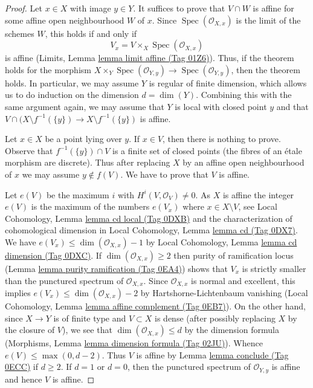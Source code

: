 \documentclass{amsart}
\theoremstyle{plain}
\theoremstyle{definition}
\theoremstyle{remark}
\numberwithin{equation}{subsection}
\def\Spec{\mathop{\mathrm{Spec}}}
\begin{document}
\begin{proof}
Let $x \in X$ with image $y \in Y$. It suffices to prove that
$V \cap W$ is affine for some affine open neighbourhood $W$ of $x$.
Since $\Spec(\mathcal{O}_{X, x})$ is the limit of the schemes $W$,
this holds if and only if
$$
V_x = V \times_X \Spec(\mathcal{O}_{X, x})
$$
is affine (Limits, Lemma \href{https://stacks.math.columbia.edu/tag/01Z6}{lemma limit affine (Tag 01Z6)}).
Thus, if the theorem holds for the morphism
$X \times_Y \Spec(\mathcal{O}_{Y, y}) \to \Spec(\mathcal{O}_{Y, y})$,
then the theorem holds. In particular, we may assume $Y$
is regular of finite dimension, which allows us to do induction
on the dimension $d = \dim(Y)$. Combining this with the same argument again,
we may assume that $Y$ is local with closed point $y$ and that
$V \cap (X \setminus f^{-1}(\{y\}) \to X \setminus f^{-1}(\{y\})$
is affine.

\medskip\noindent
Let $x \in X$ be a point lying over $y$. If $x \in V$, then
there is nothing to prove. Observe that  $f^{-1}(\{y\}) \cap V$
is a finite set of closed points (the fibres of an \'etale morphism
are discrete). Thus after replacing $X$
by an affine open neighbourhood of $x$ we may assume
$y \not \in f(V)$. We have to prove that $V$ is affine.

\medskip\noindent
Let $e(V)$ be the maximum $i$ with $H^i(V, \mathcal{O}_V) \not = 0$.
As $X$ is affine the integer $e(V)$ is the maximum of the numbers $e(V_x)$
where $x \in X \setminus V$, see
Local Cohomology, Lemma \href{https://stacks.math.columbia.edu/tag/0DXB}{lemma cd local (Tag 0DXB)}
and the characterization of cohomological dimension
in Local Cohomology, Lemma \href{https://stacks.math.columbia.edu/tag/0DX7}{lemma cd (Tag 0DX7)}.
We have $e(V_x) \leq \dim(\mathcal{O}_{X, x}) - 1$ by
Local Cohomology, Lemma \href{https://stacks.math.columbia.edu/tag/0DXC}{lemma cd dimension (Tag 0DXC)}.
If $\dim(\mathcal{O}_{X, x}) \geq 2$ then purity of
ramification locus (Lemma \href{https://stacks.math.columbia.edu/tag/0EA4}{lemma purity ramification (Tag 0EA4)})
shows that $V_x$ is strictly smaller than the punctured spectrum of
$\mathcal{O}_{X, x}$. Since $\mathcal{O}_{X, x}$ is
normal and excellent, this implies
$e(V_x) \leq \dim(\mathcal{O}_{X, x}) - 2$ by
Hartshorne-Lichtenbaum vanishing
(Local Cohomology, Lemma \href{https://stacks.math.columbia.edu/tag/0EB7}{lemma affine complement (Tag 0EB7)}).
On the other hand, since $X \to Y$ is of finite type
and $V \subset X$ is dense (after possibly replacing $X$
by the closure of $V$), we see that $\dim(\mathcal{O}_{X, x}) \leq d$
by the dimension formula
(Morphisms, Lemma \href{https://stacks.math.columbia.edu/tag/02JU}{lemma dimension formula (Tag 02JU)}).
Whence $e(V) \leq \max(0, d -  2)$.
Thus $V$ is affine by Lemma \href{https://stacks.math.columbia.edu/tag/0ECC}{lemma conclude (Tag 0ECC)}
if $d \geq 2$. If $d = 1$ or $d = 0$, then the punctured spectrum of
$\mathcal{O}_{Y, y}$ is affine and hence $V$ is affine.
\end{proof}
\end{document}
